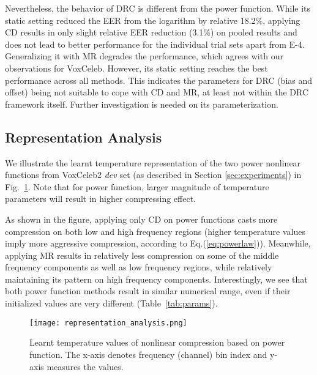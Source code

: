 \documentclass{article}
\begin{document}
Nevertheless, the behavior of DRC is different from the power function. While its static setting reduced the EER from the logarithm by relative 18.2\%, applying CD results in only slight relative EER reduction (3.1\%) on pooled results and does not lead to better performance for the individual trial sets apart from E-4. Generalizing it with MR degrades the performance, which agrees with our observations for VoxCeleb. However, its static setting reaches the best performance across all methods. This indicates the parameters for DRC (bias and offset) being not suitable to cope with CD and MR, at least not within the DRC framework itself. Further investigation is needed on its parameterization.

\subsection{Representation Analysis}

We illustrate the learnt temperature representation of the two power nonlinear functions from VoxCeleb2 \emph{dev} set (as described in Section \ref{sec:experiments}) in Fig.~\ref{fig:representations}. Note that for power function, larger magnitude of temperature parameters will result in higher compressing effect. 

As shown in the figure, applying only CD on power functions casts more compression on both low and high frequency regions (higher temperature values imply more aggressive compression, according to Eq.(\ref{eq:powerlaw})). Meanwhile, applying MR results in relatively less compression on some of the middle frequency components as well as low frequency regions, while relatively maintaining its pattern on high frequency components. Interestingly, we see that both power function methods result in similar numerical range, even if their initialized values are very different (Table~\ref{tab:params}). 

\begin{figure}
    \centering
    \texttt{[image: representation\_analysis.png]}
    \caption{Learnt temperature values of nonlinear compression based on power function. The x-axis denotes frequency (channel) bin index and y-axis measures the values.}
\label{fig:representations}
\end{figure}
\end{document}
